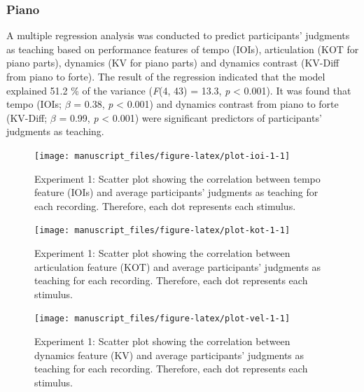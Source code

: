 \documentclass[
  man,floatsintext]{apa6}
\begin{document}
\hypertarget{piano}{%
\subsubsection{Piano}\label{piano}}

A multiple regression analysis was conducted to predict participants' judgments as teaching based on performance features of tempo (IOIs), articulation (KOT for piano parts), dynamics (KV for piano parts) and dynamics contrast (KV-Diff from piano to forte). The result of the regression indicated that the model explained 51.2 \% of the variance (\emph{F}(4, 43) = 13.3, \emph{p} \textless{} 0.001). It was found that tempo (IOIs; \emph{\(\beta\)} = 0.38, \emph{p} \textless{} 0.001) and dynamics contrast from piano to forte (KV-Diff; \emph{\(\beta\)} = 0.99, \emph{p} \textless{} 0.001) were significant predictors of participants' judgments as teaching.

\begin{figure}

{\centering \texttt{[image: manuscript\_files/figure-latex/plot-ioi-1-1]} 

}

\caption{\label{fig:ioi-1}Experiment 1: Scatter plot showing the correlation between tempo feature (IOIs) and average participants' judgments as teaching for each recording. Therefore, each dot represents each stimulus.}\label{fig:plot-ioi-1}
\end{figure}

\begin{figure}

{\centering \texttt{[image: manuscript\_files/figure-latex/plot-kot-1-1]} 

}

\caption{\label{fig:kot-1}Experiment 1: Scatter plot showing the correlation between articulation feature (KOT) and average participants' judgments as teaching for each recording. Therefore, each dot represents each stimulus.}\label{fig:plot-kot-1}
\end{figure}

\begin{figure}

{\centering \texttt{[image: manuscript\_files/figure-latex/plot-vel-1-1]} 

}

\caption{\label{fig:vel-1}Experiment 1: Scatter plot showing the correlation between dynamics feature (KV) and average participants' judgments as teaching for each recording. Therefore, each dot represents each stimulus.}\label{fig:plot-vel-1}
\end{figure}
\end{document}
